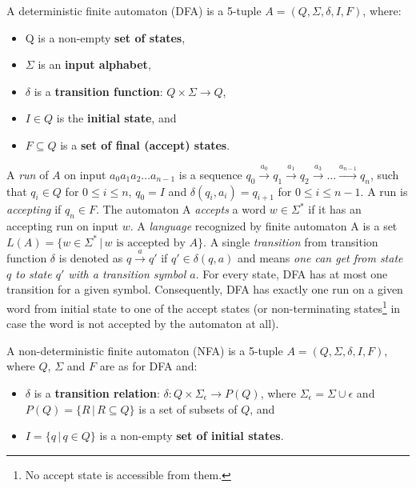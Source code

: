 \begin{definition} \hfill \newline
    A deterministic finite automaton (DFA) is a 5-tuple $A = (Q, \Sigma, \delta, I, F)$, where:
    \begin{itemize}
        \item Q is a non-empty \textbf{set of states},
        \item $\Sigma$ is an \textbf{input alphabet},
        \item $\delta$ is a \textbf{transition function}: $Q \times \Sigma \rightarrow{} Q$,
        \item $I \in Q$ is the \textbf{initial state}, and
        \item $F \subseteq Q$ is a \textbf{set of final (accept) states}.
    \end{itemize}
\end{definition}

A \emph{run} of $A$ on input $a_0a_1a_2 \ldots a_{n-1}$ is a sequence $q_0 \xrightarrow{a_0} q_1 \xrightarrow{a_1} q_2 \xrightarrow{a_3} \ldots \xrightarrow{a_{n-1}} q_n$, such that $q_i \in Q$ for $0 \leq i \leq n$, $q_0 = I$ and $\delta(q_i, a_i) = q_{i+1}$ for $0 \leq i \leq n - 1$. A run is \emph{accepting} if $q_n \in F$. The automaton A \emph{accepts} a word $w \in \Sigma^*$ if it has an accepting run on input $w$. A \emph{language} recognized by finite automaton A is a set $L(A) = \{w \in \Sigma^* \,\vert\, w \text{ is accepted by } A\}$. A single \emph{transition} from transition function $\delta$ is denoted as $q \xrightarrow{a} q'$ if $q' \in \delta(q, a)$ and means \textit{one can get from state $q$ to state $q'$ with a transition symbol $a$}. For every state, DFA has at most one transition for a given symbol. Consequently, DFA has exactly one run on a given word from initial state to one of the accept states (or non-terminating states\footnote{No accept state is accessible from them.} in case the word is not accepted by the automaton at all).

\begin{definition}
    A non-deterministic finite automaton (NFA) is a 5-tuple $A = (Q, \Sigma, \delta, I, F)$, where $Q$, $\Sigma$ and $F$ are as for DFA and:
    \begin{itemize}
        \item $\delta$ is a \textbf{transition relation}: $\delta: Q \times \Sigma_{\epsilon} \rightarrow{} P(Q)$, where $\Sigma_{\epsilon} = \Sigma \cup \epsilon$ and $P(Q) = \{R \,\vert\, R \subseteq Q\}$ is a set of subsets of $Q$, and
        \item $I = \{q \,\vert\, q \in Q\}$ is a non-empty \textbf{set of initial states}.
    \end{itemize}
\end{definition}


